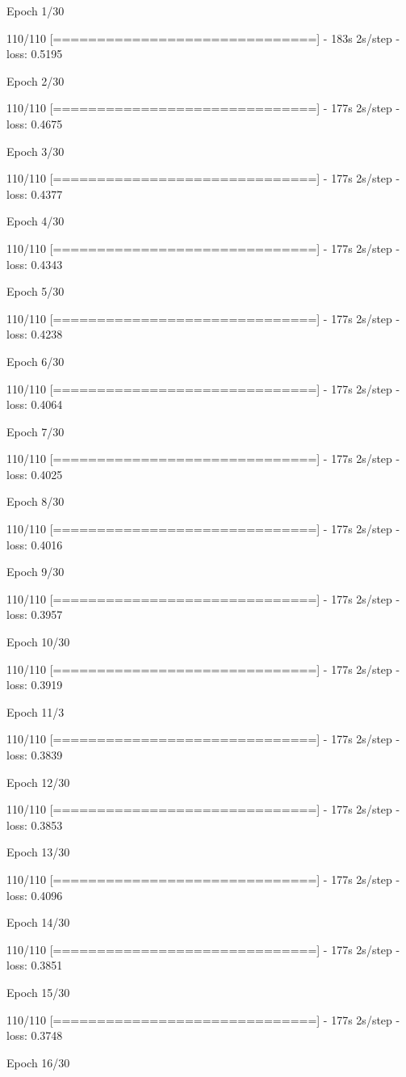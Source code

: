 \documentclass{article}
\begin{document}
Epoch 1/30\par
110/110 [==============================] - 183s 2s/step - loss: 0.5195\par
Epoch 2/30\par
110/110 [==============================] - 177s 2s/step - loss: 0.4675\par
Epoch 3/30\par
110/110 [==============================] - 177s 2s/step - loss: 0.4377\par
Epoch 4/30\par
110/110 [==============================] - 177s 2s/step - loss: 0.4343\par
Epoch 5/30\par
110/110 [==============================] - 177s 2s/step - loss: 0.4238\par
Epoch 6/30\par
110/110 [==============================] - 177s 2s/step - loss: 0.4064\par
Epoch 7/30\par
110/110 [==============================] - 177s 2s/step - loss: 0.4025\par
Epoch 8/30\par
110/110 [==============================] - 177s 2s/step - loss: 0.4016\par
Epoch 9/30\par
110/110 [==============================] - 177s 2s/step - loss: 0.3957\par
Epoch 10/30\par
110/110 [==============================] - 177s 2s/step - loss: 0.3919\par
Epoch 11/3\par
110/110 [==============================] - 177s 2s/step - loss: 0.3839\par
Epoch 12/30\par
110/110 [==============================] - 177s 2s/step - loss: 0.3853\par
Epoch 13/30\par
110/110 [==============================] - 177s 2s/step - loss: 0.4096\par
Epoch 14/30\par
110/110 [==============================] - 177s 2s/step - loss: 0.3851\par
Epoch 15/30\par
110/110 [==============================] - 177s 2s/step - loss: 0.3748\par
Epoch 16/30\par
\end{document}
